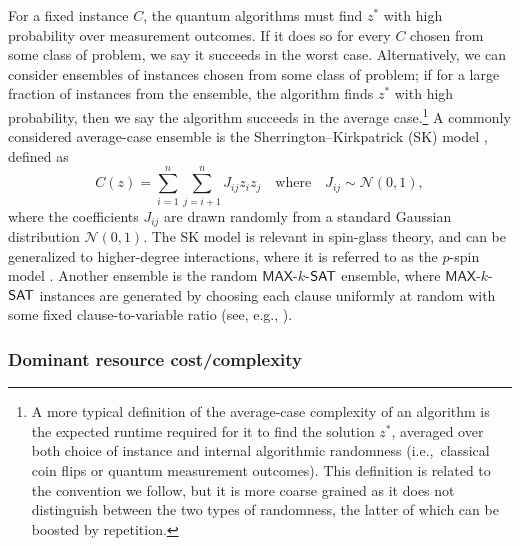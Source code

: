 \begin{refsection}
For a fixed instance $C$, the quantum algorithms must find $z^*$ with high probability over measurement outcomes. If it does so for every $C$ chosen from some class of problem, we say it succeeds in the worst case. Alternatively, we can consider ensembles of instances chosen from some class of problem; if for a large fraction of instances from the ensemble, the algorithm finds $z^*$ with high probability, then we say the algorithm succeeds in the average case.\footnote{A more typical definition of the average-case complexity of an algorithm is the expected runtime required for it to find the solution $z^*$, averaged over both choice of instance and internal algorithmic randomness (i.e.,~classical coin flips or quantum measurement outcomes). This definition is related to the convention we follow, but it is more coarse grained as it does not distinguish between the two types of randomness, the latter of which can be boosted by repetition.} A commonly considered average-case ensemble is the Sherrington--Kirkpatrick (SK) model \cite{sherrington1975solvable}, defined as
\begin{equation}
    C(z) = \sum_{i=1}^n\sum_{j=i+1}^n J_{ij} z_i z_j \quad \text{where}\quad J_{ij} \sim \mathcal{N}(0,1),
\end{equation}
where the coefficients $J_{ij}$ are drawn randomly from a standard Gaussian distribution $\mathcal{N}(0,1)$. The SK model is relevant in spin-glass theory, and can be generalized to higher-degree interactions, where it is referred to as the $p$-spin model \cite{derrida1980randomEnergyModel}. Another ensemble is the random $\mathsf{MAX}$-$k$-$\mathsf{SAT}$ ensemble, where $\mathsf{MAX}$-$k$-$\mathsf{SAT}$ instances are generated by choosing each clause uniformly at random with some fixed clause-to-variable ratio (see, e.g., \cite{coppersmith2003random}). 


\subsubsection*{Dominant resource cost/complexity}


\end{refsection}
